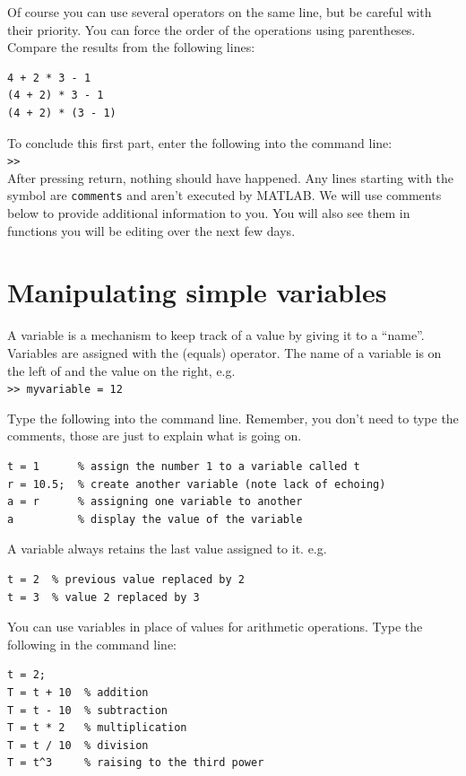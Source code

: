 \documentclass{article}
\begin{document}
Of course you can use several operators on the same line, but be careful with their priority.
You can force the order of the operations using parentheses.
Compare the results from the following lines:
\begin{lstlisting}
4 + 2 * 3 - 1
(4 + 2) * 3 - 1
(4 + 2) * (3 - 1)
\end{lstlisting}

To conclude this first part, enter the following into the command line: \\
\verb|>>|  \\
After pressing return, nothing should have happened.
Any lines starting with the \mcode{\%} symbol are \verb|comments| and aren't executed by MATLAB.
We will use comments below to provide additional information to you.
You will also see them in functions you will be editing over the next few days.


\section{Manipulating simple variables}

A variable is a mechanism to keep track of a value by giving it to a ``name''.
Variables are assigned with the \mcode{=} (equals) operator.
The name of a variable is on the left of \mcode{=} and the value on the right, e.g.\\
\verb|>> myvariable = 12|

Type the following into the command line.
Remember, you don't need to type the comments, those are just to explain what is going on.
\begin{lstlisting}
t = 1      % assign the number 1 to a variable called t
r = 10.5;  % create another variable (note lack of echoing)
a = r      % assigning one variable to another
a          % display the value of the variable
\end{lstlisting}

A variable always retains the last value assigned to it. e.g.
\begin{lstlisting}
t = 2  % previous value replaced by 2
t = 3  % value 2 replaced by 3
\end{lstlisting}

You can use variables in place of values for arithmetic operations.
Type the following in the command line:
\begin{lstlisting}
t = 2;
T = t + 10  % addition
T = t - 10  % subtraction
T = t * 2   % multiplication
T = t / 10  % division
T = t^3     % raising to the third power
\end{lstlisting}
\end{document}
